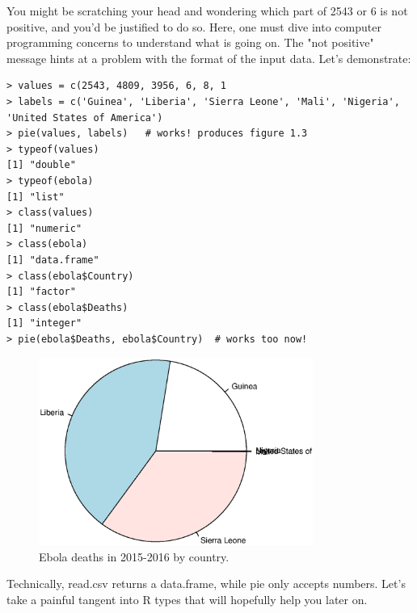 \documentclass{report}
\newcommand{\code}[1]{\textsf{\ttfamily #1}}
\begin{document}
		You might be scratching your head and wondering which part of 2543 or 6 is not positive, and you'd be justified to do so. Here, one must dive into computer programming concerns to understand what is going on. The "not positive" message hints at a problem with the format of the input data. Let's demonstrate:
		\begin{verbatim}
> values = c(2543, 4809, 3956, 6, 8, 1
> labels = c('Guinea', 'Liberia', 'Sierra Leone', 'Mali', 'Nigeria', 'United States of America')
> pie(values, labels)	# works! produces figure 1.3
> typeof(values)
[1] "double"
> typeof(ebola)
[1] "list"
> class(values)
[1] "numeric"
> class(ebola)
[1] "data.frame"
> class(ebola$Country)
[1] "factor"
> class(ebola$Deaths)
[1] "integer"
> pie(ebola$Deaths, ebola$Country)	# works too now!

		\end{verbatim}
		\begin{figure}[h]
			\centering
			\includegraphics[width=0.8\textwidth]{pie.eps}
			\caption{Ebola deaths in 2015-2016 by country.}
		\label{fig:pie}
		\end{figure}

		Technically, \code{read.csv} returns a \code{data.frame}, while \code{pie} only accepts numbers. Let's take a painful tangent into R types that will hopefully help you later on.
\end{document}
